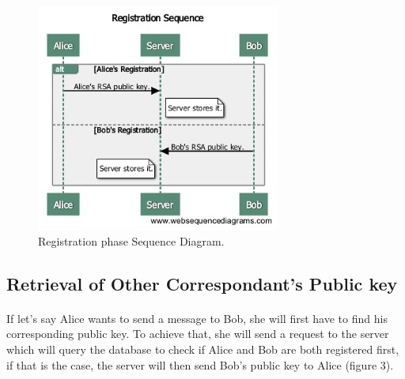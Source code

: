 	  \begin{figure}[H]
	  
	    \centering
	    \includegraphics[width=8cm]{images/architecture/registrationsequence}
	      
	    \caption{Registration phase Sequence Diagram.}
	    \label{Figure 2}
	   
	  \end{figure}
	  
	  \subsection{Retrieval of Other Correspondant's Public key}
	  
	  \paragraph{}
	  
	    If let's say Alice wants to send a message to Bob, she will first have to find his corresponding public key. To achieve that, she will send a request to the server which will query the database to check if Alice and Bob are both registered first, if that is the case, the server will then send Bob's public key to Alice (figure 3).
	    
